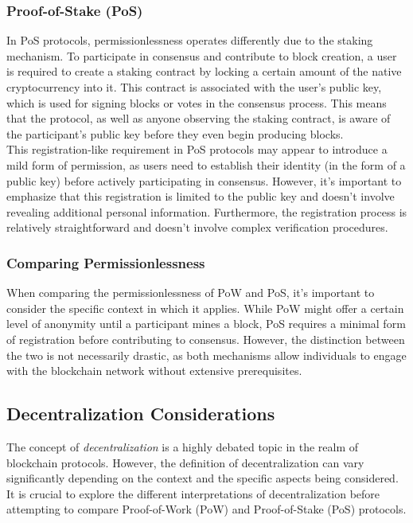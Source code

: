 \subsubsection{Proof-of-Stake (PoS)}
In PoS protocols, permissionlessness operates differently due to the staking mechanism. To participate in consensus and contribute to block creation, a user is required to create a staking contract by locking a certain amount of the native cryptocurrency into it. This contract is associated with the user's public key, which is used for signing blocks or votes in the consensus process. This means that the protocol, as well as anyone observing the staking contract, is aware of the participant's public key before they even begin producing blocks.\\
This registration-like requirement in PoS protocols may appear to introduce a mild form of permission, as users need to establish their identity (in the form of a public key) before actively participating in consensus. However, it's important to emphasize that this registration is limited to the public key and doesn't involve revealing additional personal information. Furthermore, the registration process is relatively straightforward and doesn't involve complex verification procedures.

\subsubsection{Comparing Permissionlessness}
When comparing the permissionlessness of PoW and PoS, it's important to consider the specific context in which it applies. While PoW might offer a certain level of anonymity until a participant mines a block, PoS requires a minimal form of registration before contributing to consensus. However, the distinction between the two is not necessarily drastic, as both mechanisms allow individuals to engage with the blockchain network without extensive prerequisites.

\subsection{Decentralization Considerations}

The concept of \textit{decentralization} is a highly debated topic in the realm of blockchain protocols. However, the definition of decentralization can vary significantly depending on the context and the specific aspects being considered. It is crucial to explore the different interpretations of decentralization before attempting to compare Proof-of-Work (PoW) and Proof-of-Stake (PoS) protocols.

